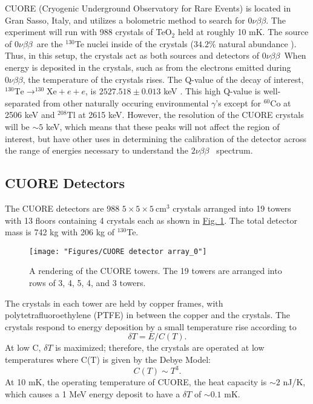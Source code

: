 \documentclass[12pt,a4paper]{article}
\newcommand{\zeronubb}{$0\nu \beta \beta$}
\newcommand{\twonubb}{$2\nu \beta \beta$}
\begin{document}
CUORE (Cryogenic Underground Observatory for Rare Events) is located in Gran Sasso, Italy, and utilizes a bolometric method to search for \zeronubb. The experiment will run with 988 crystals of TeO$_2$ held at roughly 10 mK. The source of \zeronubb~are the $^{130}$Te nuclei inside of the crystals ($34.2\%$ natural abundance \cite{Fehr200483}). Thus, in this setup, the crystals act as both sources and detectors of \zeronubb~When energy is deposited in the crystals, such as from the electrons emitted during \zeronubb, the temperature of the crystals rises. The Q-value of the decay of interest, $^{130}\textrm{Te} \rightarrow ^{130}\textrm{Xe} + e + e$, is $2527.518\pm 0.013$ keV \cite{Redshaw:2009cf}\cite{Scielzo:2009nh}\cite{Rahaman:2011zz}. This high Q-value is well-separated from other naturally occuring environmental $\gamma$'s except for $^{60}$Co at 2506 keV and $^{208}$Tl at 2615 keV. However, the resolution of the CUORE crystals will be $\sim5$ keV, which means that these peaks will not affect the region of interest, but have other uses in determining the calibration of the detector across the range of energies necessary to understand the \twonubb~ spectrum.

\subsection{CUORE Detectors}

The CUORE detectors are 988 $ 5\times 5 \times 5~ \textrm{cm}^3$ crystals arranged into 19 towers with 13 floors containing 4 crystals each as shown in \hyperref[fig:cuore-detector-array0]{Fig. \ref*{fig:cuore-detector-array0}}. The total detector mass is 742 kg with 206 kg of $^{130}$Te. 

\begin{figure}[htbp]
\centering
\texttt{[image: "Figures/CUORE detector array\_0"]}
\caption{A rendering of the CUORE towers. The 19 towers are arranged into rows of 3, 4, 5, 4, and 3 towers.}
\label{fig:cuore-detector-array0}
\end{figure}


The crystals in each tower are held by copper frames, with polytetrafluoroethylene (PTFE) in between the copper and the crystals. The crystals respond to energy deposition by a small temperature rise according to
\begin{equation}
\delta T = E/C(T).
\end{equation}
At low C, $\delta T$ is maximized; therefore, the crystals are operated at low temperatures where C(T) is given by the Debye Model:
\begin{equation}
C(T)\sim T^3.
\end{equation}
At 10 mK, the operating temperature of CUORE, the heat capacity is $\sim2$ nJ/K, which causes a 1 MeV energy deposit to have a $\delta T$ of $\sim0.1$ mK.
\end{document}
